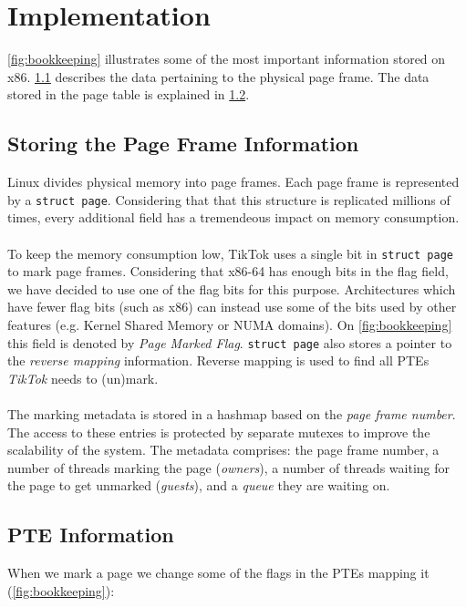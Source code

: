 \section{Implementation}
\label{sec:implementation}

\cref{fig:bookkeeping} illustrates some of the most important information stored
on x86. \cref{subsec:frameinfo} describes the data pertaining to the physical
page frame. The data stored in the page table is explained in
\cref{subsec:pageinfo}.

\subsection{Storing the Page Frame Information}
\label{subsec:frameinfo}
Linux divides physical memory into page frames. Each page frame is represented
by a \texttt{struct page}. Considering that that this structure is replicated
millions of times, every additional field has a tremendeous impact on memory
consumption.
\\
\\
To keep the memory consumption low, TikTok uses a single bit in
\texttt{struct page} to mark page frames. Considering that x86-64 has enough
bits in the flag field, we have decided to use one of the flag bits for this
purpose. Architectures which have fewer flag bits (such as x86) can instead use
some of the bits used by other features (e.g. Kernel Shared Memory or NUMA
domains). On \cref{fig:bookkeeping} this field is denoted by
\emph{Page Marked Flag}. \texttt{struct page} also stores a pointer to the
\emph{reverse mapping} information. Reverse mapping is used to find all PTEs
\emph{TikTok} needs to (un)mark.
\\
\\
The marking metadata is stored in a hashmap based on the \emph{page frame 
number}. The access to these entries is protected by separate mutexes to improve
the scalability of the system. The metadata comprises: the page frame number, a
number of threads marking the page (\emph{owners}), a number of threads waiting
for the page to get unmarked (\emph{guests}), and a \emph{queue} they are
waiting on. 

\subsection{PTE Information}
\label{subsec:pageinfo}

When we mark a page we change some of the flags in the PTEs mapping it
(\cref{fig:bookkeeping}):

